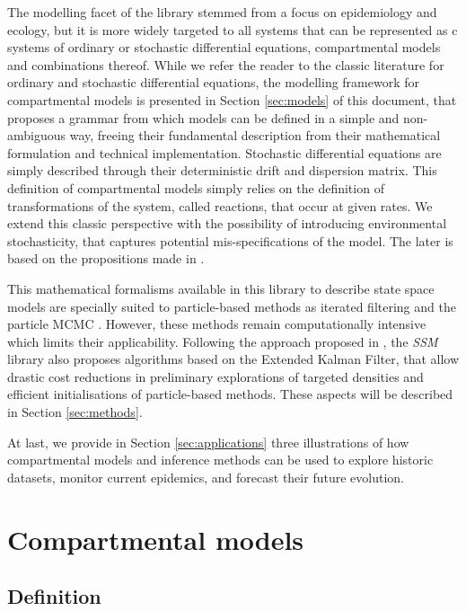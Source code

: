 \documentclass[a4paper,11pt,titlepage]{article}
\theoremstyle{plain} %
\begin{document}
The modelling facet of the library stemmed from a focus on epidemiology and ecology, but it is more widely targeted to all systems that can be represented as c systems of ordinary or stochastic differential equations, compartmental models and combinations thereof.  While we refer the reader to the classic literature for ordinary and stochastic differential equations, the modelling framework for compartmental models is presented in Section \ref{sec:models} of this document, that proposes a grammar from which models can be  defined in a simple and non-ambiguous way, freeing their fundamental description from their mathematical formulation and technical implementation. Stochastic differential equations are simply described through their deterministic drift and dispersion matrix. This definition of compartmental models simply relies on the definition of transformations of the system, called reactions, that occur at given rates. We extend this classic perspective with the possibility of introducing environmental stochasticity, that captures potential mis-specifications of the model. The later is based on the propositions made in \cite{Breto2009}.

This mathematical formalisms available in this library to describe state space models are specially suited to particle-based methods as iterated filtering \citep{Ionides2011} and the particle MCMC \citep{Andrieu2010}. However, these methods remain computationally intensive which limits their applicability. Following the approach proposed in \cite{Dureau2013a}, the \emph{SSM} library also proposes algorithms based on the Extended Kalman Filter,  that allow drastic cost reductions in preliminary explorations of targeted densities and efficient initialisations of particle-based methods. These aspects will be described in Section \ref{sec:methods}.

At last, we provide in Section \ref{sec:applications}  three illustrations of how compartmental models and inference methods can be used to explore historic datasets, monitor current epidemics, and forecast their future evolution.


\section{\label{sec:models}Compartmental models}
\subsection{Definition}
\end{document}
